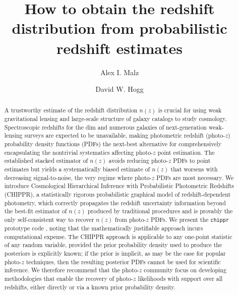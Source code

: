 \documentclass[iop]{emulateapj}
\begin{document}

\title{How to obtain the redshift distribution from probabilistic redshift estimates}

\author{Alex I. Malz}
\author{David W. Hogg}


\begin{abstract}
A trustworthy estimate of the redshift distribution $n(z)$ is crucial for using weak gravitational lensing and large-scale structure of galaxy catalogs to study cosmology.
Spectroscopic redshifts for the dim and numerous galaxies of next-generation weak-lensing surveys are expected to be unavailable, making photometric redshift (photo-$z$) probability density functions (PDFs) the next-best alternative for comprehensively encapsulating the nontrivial systematics affecting photo-$z$ point estimation.
The established stacked estimator of $n(z)$ avoids reducing photo-$z$ PDFs to point estimates but yields a systematically biased estimate of $n(z)$ that worsens with decreasing signal-to-noise, the very regime where photo-$z$ PDFs are most necessary.
We introduce Cosmological Hierarchical Inference with Probabilistic Photometric Redshifts (\textsc{CHIPPR}), a statistically rigorous probabilistic graphical model of redshift-dependent photometry, which correctly propagates the redshift uncertainty information beyond the best-fit estimator of $n(z)$ produced by traditional procedures and is provably the only self-consistent way to recover $n(z)$ from photo-$z$ PDFs.
We present the \texttt{chippr} prototype code
, noting that the mathematically justifiable approach incurs computational expense.
The \textsc{CHIPPR} approach is applicable to any one-point statistic of any random variable, provided the prior probability density used to produce the posteriors is explicitly known; 
if the prior is implicit, as may be the case for popular photo-$z$ techniques, then the resulting posterior PDFs cannot be used for scientific inference.
We therefore recommend that the photo-$z$ community focus on developing methodologies that enable the recovery of photo-$z$ likelihoods with support over all redshifts, either directly or via a known prior probability density.
\end{abstract}
\end{document}
